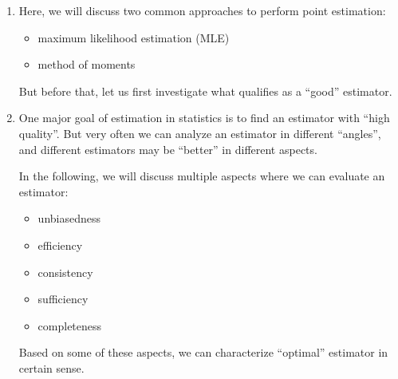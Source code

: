 \begin{enumerate}
\begin{itemize}
\end{itemize}
\begin{center}
\end{center}
\item Here, we will discuss two common approaches to perform point estimation:
\begin{itemize}
\item maximum likelihood estimation (MLE)
\item method of moments
\end{itemize}
But before that, let us first investigate what qualifies as a ``good''
estimator.

\item One major goal of estimation in statistics is to find an estimator with
``high quality''. But very often we can analyze an estimator in different
``angles'', and different estimators may be ``better'' in different aspects.

In the following, we will discuss multiple aspects where we can evaluate an
estimator:
\begin{itemize}
\item unbiasedness
\item efficiency
\item consistency
\item sufficiency
\item completeness
\end{itemize}
Based on some of these aspects, we can characterize ``optimal'' estimator in
certain sense.
\end{enumerate}
